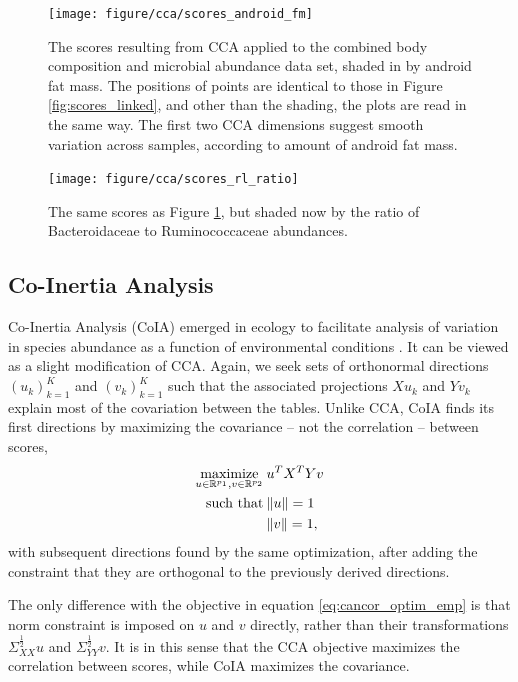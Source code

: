 \documentclass[14pt]{extarticle}
\begin{document}
\begin{figure}
  \centering
  \texttt{[image: figure/cca/scores\_android\_fm]}
  \caption{The scores resulting from CCA applied to the combined body
    composition and microbial abundance data set, shaded in by android fat mass.
    The positions of points are identical to those in Figure
    \ref{fig:scores_linked}, and other than the shading, the plots are read in
    the same way. The first two CCA dimensions suggest smooth variation across
    samples, according to amount of android fat
    mass. \label{fig:cca_scores_android_fm} }
\end{figure}

\begin{figure}
  \centering
  \texttt{[image: figure/cca/scores\_rl\_ratio]}
  \caption{The same scores as Figure \ref{fig:cca_scores_android_fm}, but shaded
    now by the ratio of Bacteroidaceae to Ruminococcaceae
    abundances. \label{fig:cca_scores_rl_ratio} }
\end{figure}

\subsection{Co-Inertia Analysis}

Co-Inertia Analysis (CoIA) emerged in ecology to facilitate analysis of
variation in species abundance as a function of environmental conditions
\citep{doledec1994co}. It can be viewed as a slight modification of CCA. Again,
we seek sets of orthonormal directions $\left(u_{k}\right)_{k = 1}^{K}$ and
$\left(v_{k}\right)_{k = 1}^{K}$ such that the associated projections $Xu_{k}$
and $Yv_{k}$ explain most of the covariation between the tables. Unlike CCA,
CoIA finds its first directions by maximizing the covariance -- not the
correlation -- between scores,
\begin{align*}
\mathop\mathrm{maximize}_{u \in \mathbb{R}^{p_{1}}, v \in \mathbb{R}^{p_{2}}}\medspace &u^{T}X^{T}Yv \\
\text{ such that}\medspace &\|u\| = 1\\
&\|v\| = 1,
\end{align*}
with subsequent directions found by the same optimization, after adding the
constraint that they are orthogonal to the previously derived directions.

The only difference with the objective in equation \ref{eq:cancor_optim_emp} is
that norm constraint is imposed on $u$ and $v$ directly, rather than their
transformations $\Sigma_{XX}^{\frac{1}{2}}u$ and $\Sigma_{YY}^{\frac{1}{2}}v$.
It is in this sense that the CCA objective maximizes the correlation between
scores, while CoIA maximizes the covariance.
\end{document}

